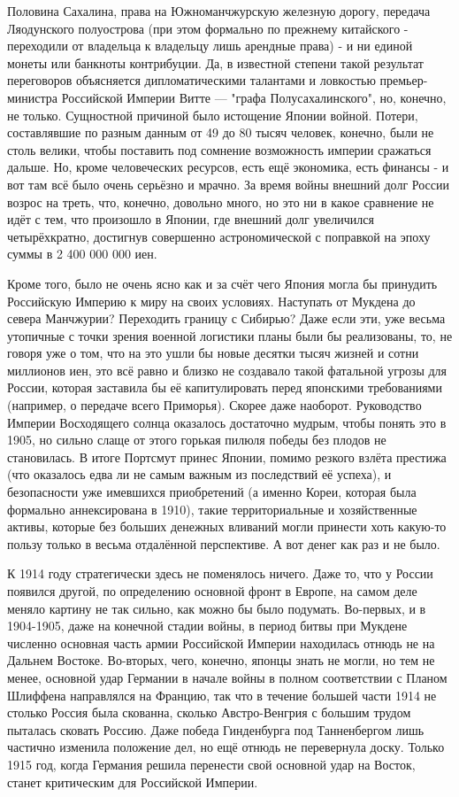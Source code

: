 Половина Сахалина, права на Южноманчжурскую железную дорогу, передача Ляодунского полуострова (при этом формально по прежнему китайского - переходили от владельца к владельцу лишь арендные права) - и ни единой монеты или банкноты контрибуции. Да, в известной степени такой результат переговоров объясняется дипломатическими талантами и ловкостью премьер-министра Российской Империи Витте — "графа Полусахалинского", но, конечно, не только. Сущностной причиной было истощение Японии войной. Потери, составлявшие по разным данным от 49 до 80 тысяч человек, конечно, были не столь велики, чтобы поставить под сомнение возможность империи сражаться дальше. Но, кроме человеческих ресурсов, есть ещё экономика, есть финансы - и вот там всё было очень серьёзно и мрачно. За время войны внешний долг России возрос на треть, что, конечно, довольно много, но это ни в какое сравнение не идёт с тем, что произошло в Японии, где внешний долг увеличился четырёхкратно, достигнув совершенно астрономической с поправкой на эпоху суммы в 2 400 000 000 иен.

Кроме того, было не очень ясно как и за счёт чего Япония могла бы принудить Российскую Империю к миру на своих условиях. Наступать от Мукдена до севера Манчжурии? Переходить границу с Сибирью? Даже если эти, уже весьма утопичные с точки зрения военной логистики планы были бы реализованы, то, не говоря уже о том, что на это ушли бы новые десятки тысяч жизней и сотни миллионов иен, это всё равно и близко не создавало такой фатальной угрозы для России, которая заставила бы её капитулировать перед японскими требованиями (например, о передаче всего Приморья). Скорее даже наоборот. Руководство Империи Восходящего солнца оказалось достаточно мудрым, чтобы понять это в 1905, но сильно слаще от этого горькая пилюля победы без плодов не становилась. В итоге Портсмут принес Японии, помимо резкого взлёта престижа (что оказалось едва ли не самым важным из последствий её успеха), и безопасности уже имевшихся приобретений (а именно Кореи, которая была формально аннексирована в 1910), такие территориальные и хозяйственные активы, которые без больших денежных вливаний могли принести хоть какую-то пользу только в весьма отдалённой перспективе. А вот денег как раз и не было.

К 1914 году стратегически здесь не поменялось ничего. Даже то, что у России появился другой, по определению основной фронт в Европе, на самом деле меняло картину не так сильно, как можно бы было подумать. Во-первых, и в 1904-1905, даже на конечной стадии войны, в период битвы при Мукдене численно основная часть армии Российской Империи находилась отнюдь не на Дальнем Востоке. Во-вторых, чего, конечно, японцы знать не могли, но тем не менее, основной удар Германии в начале войны в полном соответствии с Планом Шлиффена направлялся на Францию, так что в течение большей части 1914 не столько Россия была скованна, сколько Австро-Венгрия с большим трудом пыталась сковать Россию. Даже победа Гинденбурга под Танненбергом лишь частично изменила положение дел, но ещё отнюдь не перевернула доску. Только 1915 год, когда Германия решила перенести свой основной удар на Восток, станет критическим для Российской Империи.

